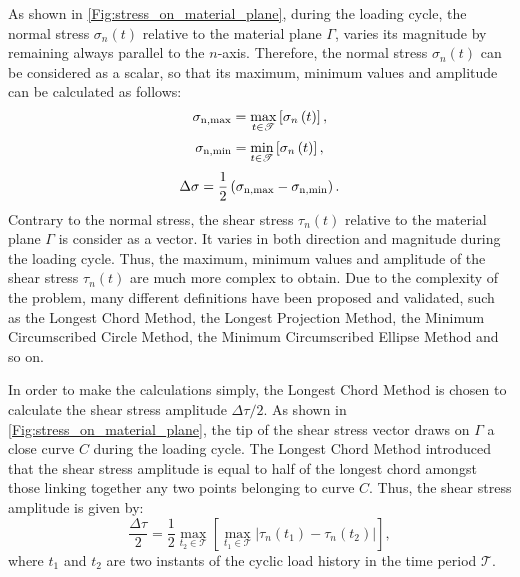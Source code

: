As shown in \ref{Fig:stress_on_material_plane}, during the loading cycle, the normal stress ${{\sigma _{{{n}}}}(t)}$ relative to the material plane $\Gamma$, varies its magnitude by remaining always parallel to the $n$-axis. Therefore, the normal stress ${{\sigma _{{{n}}}}(t)}$ can be considered as a scalar, so that its maximum, minimum values and amplitude can be calculated as follows:
\begin{equation}
{\sigma _{{\rm{n,max}}}} = \mathop {\max }\limits_{t \in \mathscr{T}} \left[ {{\sigma _n}\left( t \right)} \right],
\end{equation}
\begin{equation}
{\sigma _{{\rm{n,min}}}} = \mathop {\min }\limits_{t \in \mathscr{T}} \left[ {{\sigma _n}\left( t \right)} \right],
\end{equation}
\begin{equation}
\Delta \sigma  = \frac{1}{2}\left( {{\sigma _{{\rm{n,max}}}} - {\sigma _{{\rm{n,min}}}}} \right).
\end{equation}
Contrary to the normal stress, the shear stress ${{\tau _{{{n}}}}(t)}$ relative to the material plane $\Gamma$ is consider as a vector. It varies in both direction and magnitude during the loading cycle.
Thus, the maximum, minimum values and amplitude of the shear stress ${{\tau _{{{n}}}}(t)}$ are much more complex to obtain.
Due to the complexity of the problem, many different definitions have been proposed and validated, such as the Longest Chord Method\cite{Lemaitre1990Mechanics}, the Longest Projection Method, the Minimum Circumscribed Circle Method, the Minimum Circumscribed Ellipse Method and so on.

In order to make the calculations simply, the Longest Chord Method is chosen to calculate the shear stress amplitude $\Delta \tau/2$.
As shown in \ref{Fig:stress_on_material_plane}, the tip of the shear stress vector draws on $\Gamma$ a close curve $C$ during the loading cycle.
The Longest Chord Method introduced that the shear stress amplitude is equal to half of the longest chord amongst those linking together any two points belonging to curve $C$. Thus, the shear stress amplitude is given by:
\begin{equation}
\frac{{\Delta \tau }}{2} = \frac{1}{2}\mathop {\max }\limits_{{t_2} \in \mathscr{T}} \left[ {\mathop {\max }\limits_{{t_1} \in \mathscr{T}} \left| {{\tau _{n}}\left( {{t_1}} \right) - {\tau _{n}}\left( {{t_2}} \right)} \right|} \right],
\end{equation}
where $t_1$ and $t_2$ are two instants of the cyclic load history in the time period $\mathscr{T}$.

